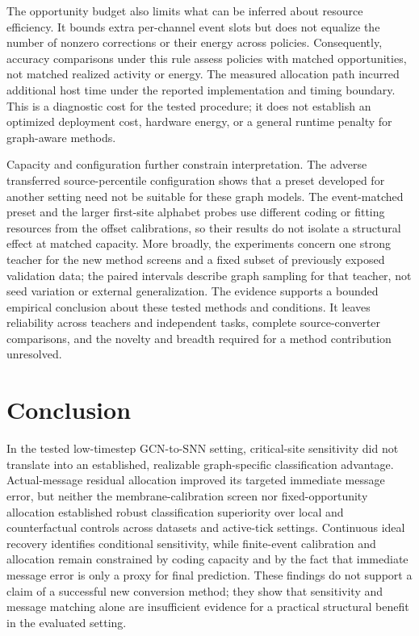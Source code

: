 \documentclass{article}
\begin{document}
The opportunity budget also limits what can be inferred about resource efficiency. It bounds extra per-channel event slots but does not equalize the number of nonzero corrections or their energy across policies. Consequently, accuracy comparisons under this rule assess policies with matched opportunities, not matched realized activity or energy. The measured allocation path incurred additional host time under the reported implementation and timing boundary. This is a diagnostic cost for the tested procedure; it does not establish an optimized deployment cost, hardware energy, or a general runtime penalty for graph-aware methods.

Capacity and configuration further constrain interpretation. The adverse transferred source-percentile configuration shows that a preset developed for another setting need not be suitable for these graph models. The event-matched preset and the larger first-site alphabet probes use different coding or fitting resources from the offset calibrations, so their results do not isolate a structural effect at matched capacity. More broadly, the experiments concern one strong teacher for the new method screens and a fixed subset of previously exposed validation data; the paired intervals describe graph sampling for that teacher, not seed variation or external generalization. The evidence supports a bounded empirical conclusion about these tested methods and conditions. It leaves reliability across teachers and independent tasks, complete source-converter comparisons, and the novelty and breadth required for a method contribution unresolved.

\section{Conclusion}

\label{sec:conclusion}

In the tested low-timestep GCN-to-SNN setting, critical-site sensitivity did not translate into an established, realizable graph-specific classification advantage. Actual-message residual allocation improved its targeted immediate message error, but neither the membrane-calibration screen nor fixed-opportunity allocation established robust classification superiority over local and counterfactual controls across datasets and active-tick settings. Continuous ideal recovery identifies conditional sensitivity, while finite-event calibration and allocation remain constrained by coding capacity and by the fact that immediate message error is only a proxy for final prediction. These findings do not support a claim of a successful new conversion method; they show that sensitivity and message matching alone are insufficient evidence for a practical structural benefit in the evaluated setting.
\end{document}
